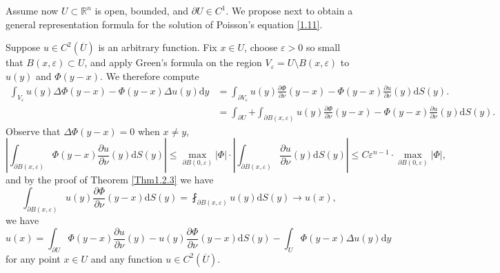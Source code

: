 Assume now $U\subset\mathbb{R}^n$ is open, bounded, and $\partial U\in C^1$. We propose next to obtain a general representation formula for the solution of Poisson's equation \eqref{1.11}.\par
Suppose $u\in C^2(\overline{U})$ is an arbitrary function. Fix $x\in U$, choose $\varepsilon>0$ so small that $B(x,\varepsilon)\subset U$, and apply Green's formula on the region $V_\varepsilon=U\setminus B(x,\varepsilon)$ to $u(y)$ and $\Phi(y-x)$. We therefore compute 
$$
\begin{aligned}
\int_{V_{\varepsilon}}{u\left( y \right) \Delta \Phi \left( y-x \right) -\Phi \left( y-x \right) \Delta u\left( y \right) \mathrm{d}y}&=\int_{\partial V_{\varepsilon}}{u\left( y \right) \frac{\partial \Phi}{\partial \nu}\left( y-x \right) -\Phi \left( y-x \right) \frac{\partial u}{\partial \nu}\left( y \right) \mathrm{d}S\left( y \right)}.
\\
&=\int_{\partial U}{+\int_{\partial B\left( x,\varepsilon \right)}{u\left( y \right) \frac{\partial \Phi}{\partial \nu}\left( y-x \right) -\Phi \left( y-x \right) \frac{\partial u}{\partial \nu}\left( y \right) \mathrm{d}S\left( y \right)}}.
\end{aligned}
$$
Observe that $\Delta\Phi(y-x)=0$ when $x\ne y$, 
$$
\left| \int_{\partial B\left( x,\varepsilon \right)}{\Phi \left( y-x \right) \frac{\partial u}{\partial \nu}\left( y \right) \mathrm{d}S\left( y \right)} \right|\le \max_{\partial B\left( 0,\varepsilon \right)} \left| \Phi \right|\cdot \left| \int_{\partial B\left( x,\varepsilon \right)}{\frac{\partial u}{\partial \nu}\left( y \right) \mathrm{d}S\left( y \right)} \right|\le C\varepsilon ^{n-1}\cdot \max_{\partial B\left( 0,\varepsilon \right)} \left| \Phi \right|,
$$
and by the proof of Theorem \ref{Thm1.2.3} we have 
$$
\int_{\partial B\left( x,\varepsilon \right)}{u\left( y \right) \frac{\partial \Phi}{\partial \nu}\left( y-x \right) \mathrm{d}S\left( y \right)}=\fint_{\partial B\left( x,\varepsilon \right)}{u\left( y \right) \mathrm{d}S\left( y \right)}\rightarrow u\left( x \right) ,
$$
we have 
\begin{equation}\label{1.15}
u\left( x \right) =\int_{\partial U}{\Phi \left( y-x \right) \frac{\partial u}{\partial \nu}\left( y \right) -u\left( y \right) \frac{\partial \Phi}{\partial \nu}\left( y-x \right) \mathrm{d}S\left( y \right)}-\int_U{\Phi \left( y-x \right) \Delta u\left( y \right) \mathrm{d}y}
\end{equation}
for any point $x\in U$ and any function $u\in C^2(\overline{U})$.\par
